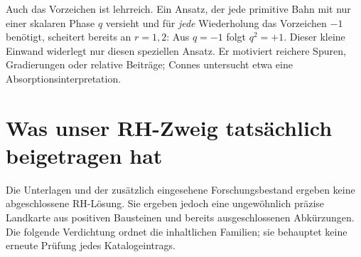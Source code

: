 Auch das Vorzeichen ist lehrreich. Ein Ansatz, der jede primitive Bahn mit nur einer skalaren Phase $q$ versieht und für \emph{jede} Wiederholung das Vorzeichen $-1$ benötigt, scheitert bereits an $r=1,2$: Aus $q=-1$ folgt $q^2=+1$. Dieser kleine Einwand widerlegt nur diesen speziellen Ansatz. Er motiviert reichere Spuren, Gradierungen oder relative Beiträge; Connes untersucht etwa eine Absorptionsinterpretation. 

\section{Was unser RH-Zweig tatsächlich beigetragen hat}
Die Unterlagen und der zusätzlich eingesehene Forschungsbestand ergeben keine abgeschlossene RH-Lösung. Sie ergeben jedoch eine ungewöhnlich präzise Landkarte aus positiven Bausteinen und bereits ausgeschlossenen Abkürzungen. Die folgende Verdichtung ordnet die inhaltlichen Familien; sie behauptet keine erneute Prüfung jedes Katalogeintrags.

